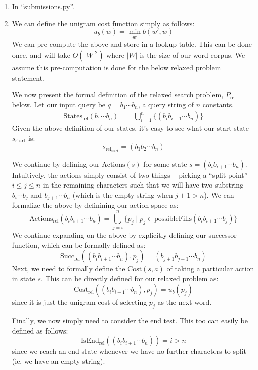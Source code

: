 \documentclass[12pt]{article}
\begin{document}
\begin{enumerate}[label=(\alph*)]
  \item In ``submissions.py''.
  \item We can define the unigram cost function simply as follows:
  $$
    u_b(w) = \min_{w'} b(w', w)
  $$
  We can pre-compute the above and store in a lookup table. This can be done once, and will take $O(|W|^2)$ where $|W|$ is the size of our word corpus. We assume this pre-computation is done for the below relaxed problem statement.

  We now present the formal definition of the relaxed search problem, $P_{\text{rel}}$ below. Let our input query be $q = b_1 \cdots b_n$, a query string of $n$ constants.
  \begin{align*}
    \text{States}_{\text{rel}}(b_1 \cdots b_n) &= \bigcup_{i=1}^n \{(b_ib_{i+1}\cdots b_{n})\}
  \end{align*}
  Given the above definition of our states, it's easy to see what our start state $s_{\text{start}}$ is:
  $$
    s_{\text{rel}_{\text{start}}} = (b_1b_2 \cdots b_n)
  $$

  We continue by defining our $\text{Actions}(s)$ for some state $s = (b_ib_{i+1} \cdots b_n)$. Intuitively, the actions simply consist of two things -- picking a ``split point'' $i \leq j \leq n$ in the remaining characters such that we will have two substring $b_i \cdots b_j$ and $b_{j+1}\cdots b_{n}$ (which is the empty string when $j + 1 >  n$). We can formalize the above by definining our action space as:
  $$
    \text{Actions}_{\text{rel}}(b_ib_{i+1} \cdots b_n) = \bigcup_{j=i}^n \{p_j \mid p_j \in \text{possibleFills}(b_ib_{i+1}\cdots b_{j})\}
  $$
  We continue expanding on the above by explicitly defining our successor function, which can be formally defined as:
  $$
    \text{Succ}_{\text{rel}}((b_ib_{i+1} \cdots b_n), p_j) = (b_{j+1}b_{j+1}\cdots b_n)
  $$
  Next, we need to formally define the $\text{Cost}(s, a)$ of taking a particular action in state $s$. This can be directly defined for our relaxed problem as:
  $$
    \text{Cost}_{\text{rel}}((b_ib_{i+1} \cdots b_n), p_j) = u_b(p_j)
  $$
  since it is just the unigram cost of selecting $p_j$ as the next word.

  Finally, we now simply need to consider the end test. This too can easily be defined as follows:
  $$
    \text{IsEnd}_{\text{rel}}((b_ib_{i+1} \cdots b_n)) = i > n
  $$
  since we reach an end state whenever we have no further characters to split (ie, we have an empty string). 


\end{enumerate}
\end{document}
